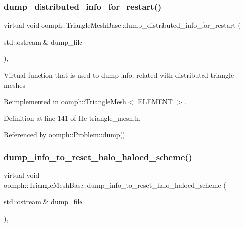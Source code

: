 \subsubsection{\texorpdfstring{dump\+\_\+distributed\+\_\+info\+\_\+for\+\_\+restart()}{dump\_distributed\_info\_for\_restart()}}
{\footnotesize\ttfamily virtual void oomph\+::\+Triangle\+Mesh\+Base\+::dump\+\_\+distributed\+\_\+info\+\_\+for\+\_\+restart (\begin{DoxyParamCaption}\item[{std\+::ostream \&}]{dump\+\_\+file }\end{DoxyParamCaption})\hspace{0.3cm}{\ttfamily [inline]}, {\ttfamily [virtual]}}

Virtual function that is used to dump info. related with distributed triangle meshes 

Reimplemented in \hyperlink{classoomph_1_1TriangleMesh_ab4472dde562e25eaa590557a38ead8c3}{oomph\+::\+Triangle\+Mesh$<$ E\+L\+E\+M\+E\+N\+T $>$}.



Definition at line 141 of file triangle\+\_\+mesh.\+h.



Referenced by oomph\+::\+Problem\+::dump().

\mbox{\label{classoomph_1_1TriangleMeshBase_a4254c01acfaf43213d96491902334148}} 
\subsubsection{\texorpdfstring{dump\+\_\+info\+\_\+to\+\_\+reset\+\_\+halo\+\_\+haloed\+\_\+scheme()}{dump\_info\_to\_reset\_halo\_haloed\_scheme()}}
{\footnotesize\ttfamily virtual void oomph\+::\+Triangle\+Mesh\+Base\+::dump\+\_\+info\+\_\+to\+\_\+reset\+\_\+halo\+\_\+haloed\+\_\+scheme (\begin{DoxyParamCaption}\item[{std\+::ostream \&}]{dump\+\_\+file }\end{DoxyParamCaption})\hspace{0.3cm}{\ttfamily [inline]}, {\ttfamily [virtual]}}

